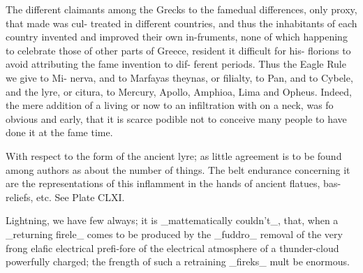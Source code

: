 \documentclass{article}
\begin{document}
The different claimants among the Grecks to the famedual differences, only proxy, that made was cul- treated in different countries, and thus the inhabitants of each country invented and improved their own in-fruments, none of which happening to celebrate those of other parts of Greece, resident it difficult for his- florions to avoid attributing the fame invention to dif- ferent periods. Thus the Eagle Rule we give to Mi- nerva, and to Marfayas theynas, or filialty, to Pan, and to Cybele, and the lyre, or citura, to Mercury, Apollo, Amphioa, Lima and Opheus. Indeed, the mere addition of a living or now to an infiltration with on a neck, was fo obvious and early, that it is scarce podible not to conceive many people to have done it at the fame time.

With respect to the form of the ancient lyre; as little agreement is to be found among authors as about the number of things. The belt endurance concerning it are the representations of this inflamment in the hands of ancient flatues, bas-reliefs, etc. See Plate CLXI.

Lightning, we have few always; it is \_mattematically couldn’t\_, that, when a \_returning firele\_ comes to be produced by the \_fuddro\_ removal of the very frong elafic electrical prefi-fore of the electrical atmosphere of a thunder-cloud powerfully charged; the frength of such a retraining \_fireks\_ mult be enormous.
\end{document}
